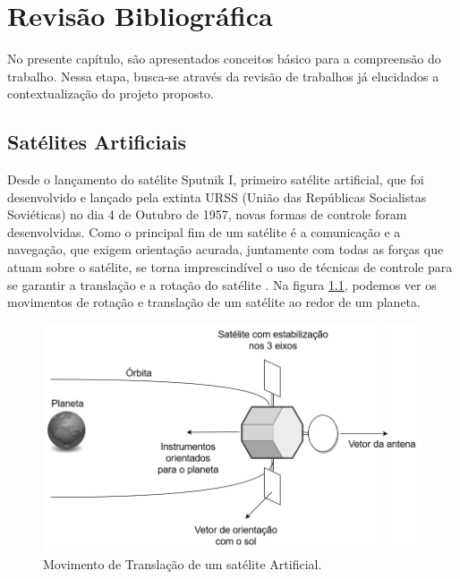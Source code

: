 \chapter{Revisão Bibliográfica}

No presente capítulo, são apresentados conceitos básico para a compreensão do trabalho. Nessa etapa, busca-se através da revisão de trabalhos já elucidados a contextualização do projeto proposto.



\section{Satélites Artificiais} %

Desde o lançamento do satélite Sputnik I, primeiro satélite artificial, que foi desenvolvido e lançado pela extinta URSS (União das Repúblicas Socialistas Soviéticas) no dia 4 de Outubro de 1957, novas formas de controle foram desenvolvidas. Como o principal fim de um satélite é a comunicação e a navegação, que exigem orientação acurada, juntamente com todas as forças que atuam sobre o satélite, se torna imprescindível o uso de técnicas de controle para se garantir a translação e a rotação do satélite \cite{Brown2002}. Na figura \ref{fig:rotational_brown_p256}, podemos ver os movimentos de rotação e translação de um satélite ao redor de um planeta.

\begin{figure}[H]
  \caption{Movimento de Translação de um satélite Artificial.}
  \begin{center}
      \includegraphics[scale=0.5]{referencial/img/rotational_brown_p256}
  \end{center}
  \label{fig:rotational_brown_p256}
\end{figure}

